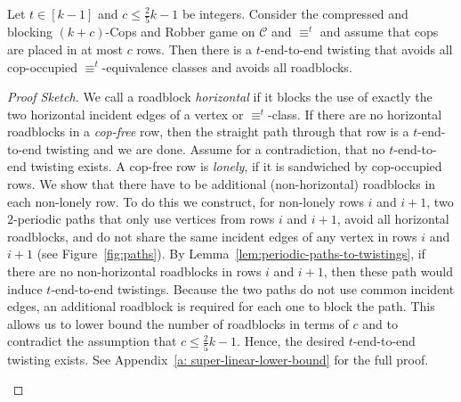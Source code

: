 \documentclass[a4paper,english, thm-restate]{lipics-v2021}
\newcommand{\defining}[1]{\emph{#1}}
\newcommand{\comp}{\equiv}
\newcommand{\grid}{\mathcal{C}}
\newcommand{\ifAppendix}[1]{#1}
\begin{document}
\begin{lemma}
        \label{lem:no-separator-with-too-many-roadblocks}
        Let $t \in [k-1]$ and $c \leq \frac{2}{5}k-1$ be integers.
        Consider the compressed and blocking $(k + c)$-Cops and Robber
        game on $\grid$ and $\comp^t$
        and assume that cops are placed in at most $c$ rows. 
        Then there is a $t$\nobreakdash-end-to-end twisting
        that avoids all cop-occupied $\comp^t$\nobreakdash-equivalence classes
        and avoids all roadblocks.
        \end{lemma}
\begin{proof}[Proof Sketch]
        We call a roadblock \defining{horizontal} 
        if it blocks the use of exactly the two horizontal incident edges of a vertex or $\comp^t$-class.
        If there are no horizontal roadblocks in a \defining{cop-free} row,
        then the straight path through that row is a 
        $t$-end-to-end twisting and we are done. Assume for a contradiction, that no $t$-end-to-end twisting exists.
        A cop-free row is \defining{lonely},
        if it is sandwiched by cop-occupied rows.
        We show that there have to be additional (non-horizontal) roadblocks in each  non-lonely row.
        To do this we construct, for non-lonely rows $i$ and $i+1$, two $2$-periodic paths that only use vertices from rows $i$ and $i+1$,
        avoid all horizontal roadblocks, and
        do not share the same incident edges of any vertex in rows $i$ and $i+1$ (see Figure~\ref{fig:paths}).
        By Lemma~\ref{lem:periodic-paths-to-twistings}, if there are no non-horizontal roadblocks in rows $i$ and $i+1$, then
        these path would induce $t$-end-to-end twistings. 
        Because the two paths do not use common incident edges,
         an additional roadblock is required for each one to block the path.
         This allows us to lower bound the number of roadblocks in terms of $c$ and to contradict the assumption that
         $c \leq \frac{2}{5}k - 1$.
         Hence, the desired $t$-end-to-end twisting exists. \ifAppendix{See Appendix~\ref{a: super-linear-lower-bound} for the full proof.} \qedhere
        
        \begin{figure}
                \centering 
\end{figure}
\end{proof}
\end{document}
